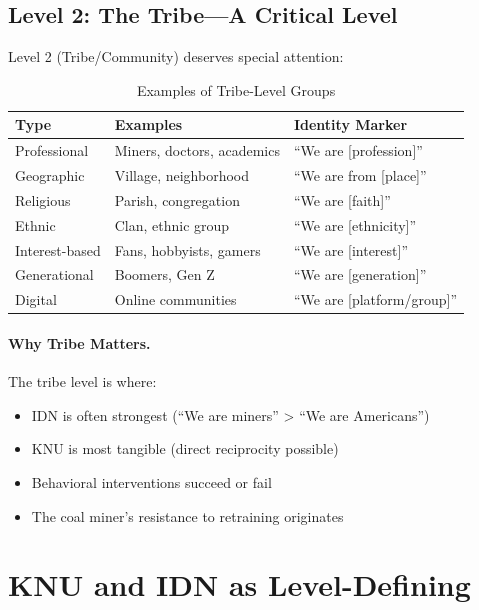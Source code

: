 \subsection{Level 2: The Tribe---A Critical Level}

Level 2 (Tribe/Community) deserves special attention:

\begin{table}[htbp]
\centering
\caption{Examples of Tribe-Level Groups}
\label{tab:aaa-tribes}
\renewcommand{\arraystretch}{1.3}
\begin{tabular}{@{}lll@{}}
\toprule
\textbf{Type} & \textbf{Examples} & \textbf{Identity Marker} \\
\midrule
Professional & Miners, doctors, academics & ``We are [profession]'' \\
Geographic & Village, neighborhood & ``We are from [place]'' \\
Religious & Parish, congregation & ``We are [faith]'' \\
Ethnic & Clan, ethnic group & ``We are [ethnicity]'' \\
Interest-based & Fans, hobbyists, gamers & ``We are [interest]'' \\
Generational & Boomers, Gen Z & ``We are [generation]'' \\
Digital & Online communities & ``We are [platform/group]'' \\
\bottomrule
\end{tabular}
\end{table}

\paragraph{Why Tribe Matters.}
The tribe level is where:
\begin{itemize}
\item IDN is often strongest (``We are miners'' > ``We are Americans'')
\item KNU is most tangible (direct reciprocity possible)
\item Behavioral interventions succeed or fail
\item The coal miner's resistance to retraining originates
\end{itemize}

\section{KNU and IDN as Level-Defining}
\label{sec:aaa-knu-idn}

